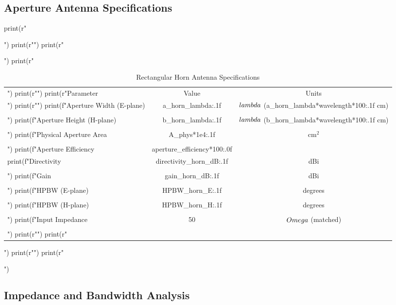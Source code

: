 \documentclass[a4paper, 11pt]{article}
\begin{document}
\subsection{Aperture Antenna Specifications}

\begin{pycode}
print(r"\begin{table}[htbp]")
print(r"\centering")
print(r"\caption{Rectangular Horn Antenna Specifications}")
print(r"\begin{tabular}{lcc}")
print(r"\toprule")
print(r"Parameter & Value & Units \\")
print(r"\midrule")
print(f"Aperture Width (E-plane) & {a_horn_lambda:.1f} & $\\lambda$ ({a_horn_lambda*wavelength*100:.1f} cm) \\\\")
print(f"Aperture Height (H-plane) & {b_horn_lambda:.1f} & $\\lambda$ ({b_horn_lambda*wavelength*100:.1f} cm) \\\\")
print(f"Physical Aperture Area & {A_phys*1e4:.1f} & cm$^2$ \\\\")
print(f"Aperture Efficiency & {aperture_efficiency*100:.0f} & \\%
print(f"Directivity & {directivity_horn_dB:.1f} & dBi \\\\")
print(f"Gain & {gain_horn_dB:.1f} & dBi \\\\")
print(f"HPBW (E-plane) & {HPBW_horn_E:.1f} & degrees \\\\")
print(f"HPBW (H-plane) & {HPBW_horn_H:.1f} & degrees \\\\")
print(f"Input Impedance & 50 & $\\Omega$ (matched) \\\\")
print(r"\bottomrule")
print(r"\end{tabular}")
print(r"\label{tab:horn_specs}")
print(r"\end{table}")
\end{pycode}

\subsection{Impedance and Bandwidth Analysis}
\end{document}
